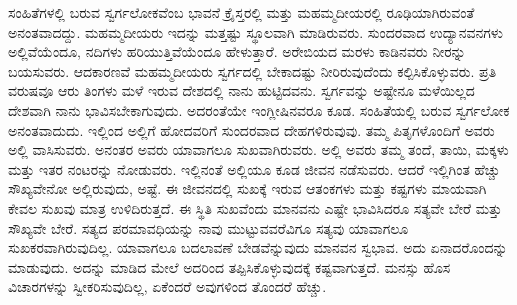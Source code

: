 \vskip 6pt

ಸಂಹಿತೆಗಳಲ್ಲಿ ಬರುವ ಸ್ವರ್ಗಲೋಕವೆಂಬ ಭಾವನೆ ಕ್ರೈಸ್ತರಲ್ಲಿ ಮತ್ತು ಮಹಮ್ಮದೀಯರಲ್ಲಿ ರೂಢಿಯಾಗಿರುವಂತೆ ಅನಂತವಾದದ್ದು. ಮಹಮ್ಮದೀಯರು ಇದನ್ನು ಮತ್ತಷ್ಟು ಸ್ಥೂಲವಾಗಿ ಮಾಡಿರುವರು. ಸುಂದರವಾದ ಉದ್ಯಾನವನಗಳು ಅಲ್ಲಿವೆಯೆಂದೂ, ನದಿಗಳು ಹರಿಯುತ್ತಿವೆಯೆಂದೂ ಹೇಳುತ್ತಾರೆ. ಅರೇಬಿಯದ ಮರಳು ಕಾಡಿನವರು ನೀರನ್ನು ಬಯಸುವರು. ಆದಕಾರಣವೆ ಮಹಮ್ಮದೀಯರು ಸ್ವರ್ಗದಲ್ಲಿ ಬೇಕಾದಷ್ಟು ನೀರಿರುವುದೆಂದು ಕಲ್ಪಿಸಿಕೊಳ್ಳುವರು. ಪ್ರತಿ ವರುಷವೂ ಆರು ತಿಂಗಳು ಮಳೆ ಇರುವ ದೇಶದಲ್ಲಿ ನಾನು ಹುಟ್ಟಿದವನು. ಸ್ವರ್ಗವನ್ನು ಅಷ್ಟೇನೂ ಮಳೆಯಿಲ್ಲದ ದೇಶವಾಗಿ ನಾನು ಭಾವಿಸಬೇಕಾಗುವುದು. ಅದರಂತೆಯೇ ಇಂಗ್ಲೀಷಿನವರೂ ಕೂಡ. ಸಂಹಿತೆಯಲ್ಲಿ ಬರುವ ಸ್ವರ್ಗಲೋಕ ಅನಂತವಾದುದು. ಇಲ್ಲಿಂದ ಅಲ್ಲಿಗೆ ಹೋದವರಿಗೆ ಸುಂದರವಾದ ದೇಹಗಳಿರುವುವು. ತಮ್ಮ ಪಿತೃಗಳೊಂದಿಗೆ ಅವರು ಅಲ್ಲಿ ವಾಸಿಸುವರು. ಅನಂತರ ಅವರು ಯಾವಾಗಲೂ ಸುಖವಾಗಿರುವರು. ಅಲ್ಲಿ ಅವರು ತಮ್ಮ ತಂದೆ, ತಾಯಿ, ಮಕ್ಕಳು ಮತ್ತು ಇತರ ನಂಟರನ್ನು ನೋಡುವರು. ಇಲ್ಲಿನಂತೆ ಅಲ್ಲಿಯೂ ಕೂಡ ಜೀವನ ನಡೆಸುವರು. ಆದರೆ ಇಲ್ಲಿಗಿಂತ ಹೆಚ್ಚು ಸೌಖ್ಯವೇನೋ ಅಲ್ಲಿರುವುದು, ಅಷ್ಟೆ. ಈ ಜೀವನದಲ್ಲಿ ಸುಖಕ್ಕೆ ಇರುವ ಆತಂಕಗಳು ಮತ್ತು ಕಷ್ಟಗಳು ಮಾಯವಾಗಿ ಕೇವಲ ಸುಖವು ಮಾತ್ರ ಉಳಿದಿರುತ್ತದೆ. ಈ ಸ್ಥಿತಿ ಸುಖವೆಂದು ಮಾನವನು ಎಷ್ಟೇ ಭಾವಿಸಿದರೂ ಸತ್ಯವೇ ಬೇರೆ ಮತ್ತು ಸೌಖ್ಯವೇ ಬೇರೆ. ಸತ್ಯದ ಪರಮಾವಧಿಯನ್ನು ನಾವು ಮುಟ್ಟುವವರೆವಿಗೂ ಸತ್ಯವು ಯಾವಾಗಲೂ ಸುಖಕರವಾಗಿರುವುದಿಲ್ಲ. ಯಾವಾಗಲೂ ಬದಲಾವಣೆ ಬೇಡವೆನ್ನುವುದು ಮಾನವನ ಸ್ವಭಾವ. ಅದು ಏನಾದರೊಂದನ್ನು ಮಾಡುವುದು. ಅದನ್ನು ಮಾಡಿದ ಮೇಲೆ ಅದರಿಂದ ತಪ್ಪಿಸಿಕೊಳ್ಳುವುದಕ್ಕೆ ಕಷ್ಟವಾಗುತ್ತದೆ. ಮನಸ್ಸು ಹೊಸ ವಿಚಾರಗಳನ್ನು ಸ್ವೀಕರಿಸುವುದಿಲ್ಲ, ಏಕೆಂದರೆ ಅವುಗಳಿಂದ ತೊಂದರೆ ಹೆಚ್ಚು. 

\vskip 6pt

